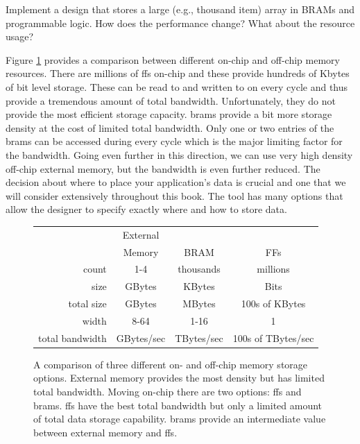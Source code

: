 \begin{exercise}
Implement a design that stores a large (e.g., thousand item) array in BRAMs and programmable logic. How does the performance change? What about the resource usage?
\end{exercise}

Figure \ref{fig:FPGAmemories} provides a comparison between different on-chip and off-chip memory resources. There are millions of \glspl{ff} on-chip and these provide hundreds of Kbytes of bit level storage. These can be read to and written to on every cycle and thus provide a tremendous amount of total bandwidth. Unfortunately, they do not provide the most efficient storage capacity. \glspl{bram} provide a bit more storage density at the cost of limited total bandwidth. Only one or two entries of the \glspl{bram} can be accessed during every cycle which is the major limiting factor for the bandwidth. Going even further in this direction, we can use very high density off-chip external memory, but the bandwidth is even further reduced. The decision about where to place your application's data is crucial and one that we will consider extensively throughout this book. The \VHLS tool has many options that allow the designer to specify exactly where and how to store data. 


\begin{figure}
\centering
 
\begin{tabular}{|r|c|c|c|}
\hline
 & External &  & \\
  & Memory & BRAM & FFs \\
\hline
count & 1-4 & thousands & millions \\
size & GBytes & KBytes & Bits \\
total size & GBytes & MBytes & 100s of KBytes \\
width & 8-64 & 1-16 & 1 \\
total bandwidth & GBytes/sec & TBytes/sec & 100s of TBytes/sec \\
\hline
\end{tabular}
\caption{A comparison of three different on- and off-chip memory storage options. External memory provides the most density but has limited total bandwidth. Moving on-chip there are two options: \glspl{ff} and \glspl{bram}. \glspl{ff} have the best total bandwidth but only a limited amount of total data storage capability. \glspl{bram} provide an intermediate value between external memory and \glspl{ff}.}
\label{fig:FPGAmemories}
\end{figure}


